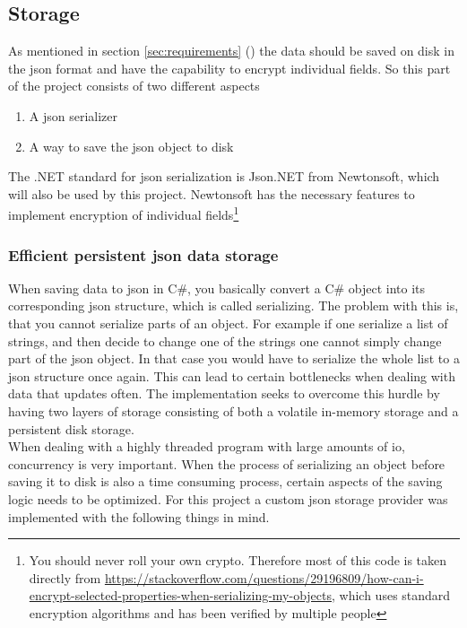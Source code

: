 \documentclass{article}
\begin{document}
\subsection{Storage}
As mentioned in section \ref{sec:requirements} () the data should be saved on disk in the \gls{json} format and have the capability to encrypt individual fields. So this part of the project consists of two different aspects
\begin{enumerate}
    \item A \gls{json} serializer
    \item A way to save the \gls{json} object to disk
\end{enumerate}
The .NET standard for \gls{json} serialization is Json.NET from Newtonsoft\cite{url:considerations:newtonsoft}, which will also be used by this project. Newtonsoft has the necessary features to implement encryption of individual fields\footnote{You should never roll your own crypto. Therefore most of this code is taken directly from \url{https://stackoverflow.com/questions/29196809/how-can-i-encrypt-selected-properties-when-serializing-my-objects}, which uses standard encryption algorithms and has been verified by multiple people}
\\
\subsubsection{Efficient persistent \gls{json} data storage}
When saving data to \gls{json} in C\#, you basically convert a C\# object into its corresponding \gls{json} structure, which is called serializing. The problem with this is, that you cannot serialize parts of an object. For example if one serialize a list of strings, and then decide to change one of the strings one cannot simply change part of the \gls{json} object. In that case you would have to serialize the whole list to a \gls{json} structure once again. This can lead to certain bottlenecks when dealing with data that updates often. The implementation seeks to overcome this hurdle by having two layers of storage consisting of both a volatile in-memory storage and a persistent disk storage.
\\
When dealing with a highly threaded program with large amounts of \gls{io}, concurrency is very important. When the process of serializing an object before saving it to disk is also a time consuming process, certain aspects of the saving logic needs to be optimized. For this project a custom \gls{json} storage provider was implemented with the following things in mind.
\end{document}
